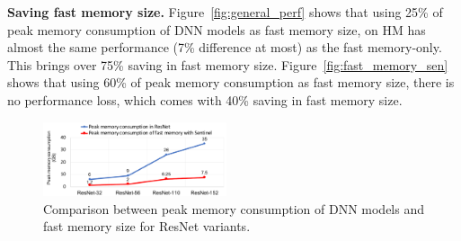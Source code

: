 




\textbf{Saving fast memory size.} 
\textcolor{check}{Figure~\ref{fig:general_perf} shows that using 25\% of peak memory consumption of DNN models as fast memory size, \name on HM has almost the same performance (7\% difference at most) as the fast memory-only. 
This brings over 75\% saving in fast memory size.} 
Figure~\ref{fig:fast_memory_sen} shows that using 60\% of peak memory consumption as fast memory size, there is no performance loss, which comes with 40\% saving in fast memory size.




\begin{figure}[!t]
\centering
\includegraphics[width=0.48\textwidth]{figures/resnet_diff_input.pdf}
\vspace{-20pt}
\caption{Comparison between peak memory consumption of DNN models and fast memory size for ResNet variants.}
\vspace{-10pt}
\label{fig:mem_consumption}
\end{figure}

